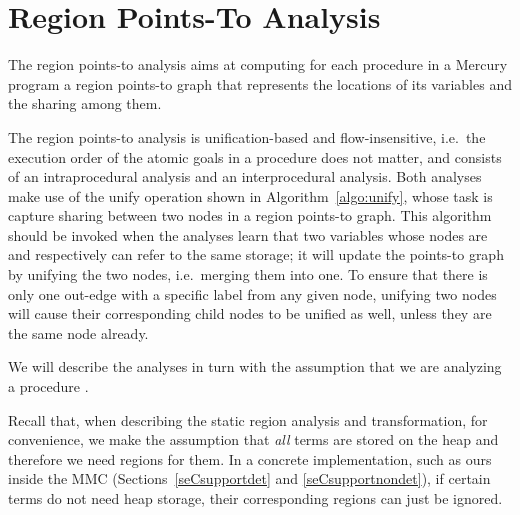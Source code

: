 \documentclass{tlp}
\begin{document}
\section{Region Points-To Analysis}
\label{seCrpta}

The region points-to analysis aims at computing
for each procedure in a Mercury program
a region points-to graph that represents
the locations of its variables and the sharing among them.

The region points-to analysis is unification-based and flow-insensitive,
i.e.\ the execution order of the atomic goals in a procedure does not matter,
and consists of an intraprocedural analysis and an interprocedural analysis.
Both analyses make use of the unify operation
shown in Algorithm~\ref{algo:unify},
whose task is capture sharing between two nodes in a region points-to graph.
This algorithm should be invoked when the analyses learn
that two variables whose nodes are  and  respectively
can refer to the same storage;
it will update the points-to graph by unifying the two nodes,
i.e.\ merging them into one.
To ensure that
there is only one out-edge with a specific label from any given node,
unifying two nodes will cause
their corresponding child nodes to be unified as well,
unless they are the same node already.

\begin{algorithm}
    \small
    \caption{}
    \label{algo:unify}
\begin{algorithmic}

    \STATE 

    \STATE 

\FORALL{}
        \STATE 
        \IF{}
            \STATE 
        \ENDIF
    \ENDFOR

    \FORALL{}
        \STATE 
        \IF{}
            \STATE 
        \ENDIF
    \ENDFOR

\FORALL{}
        \IF{}
            \STATE 
        \ENDIF
    \ENDFOR

\end{algorithmic}
\normalsize
\end{algorithm}

We will describe the analyses in turn
with the assumption that we are analyzing a procedure .

Recall that, when describing the static region analysis and transformation,
for convenience, we make the assumption that
\emph{all} terms are stored on the heap and therefore we need regions for them.
In a concrete implementation, such as ours inside the MMC
(Sections~\ref{seCsupportdet} and \ref{seCsupportnondet}),
if certain terms do not need heap storage,
their corresponding regions can just be ignored.
\end{document}
